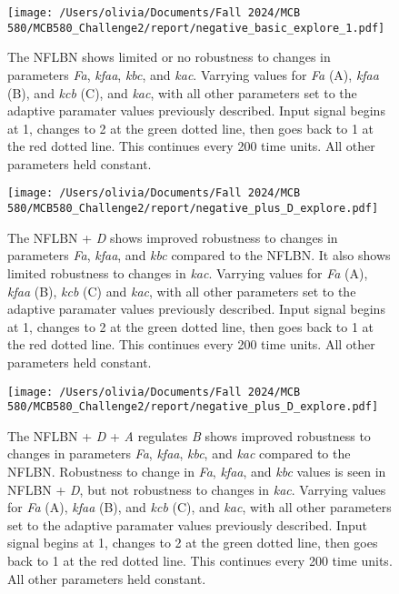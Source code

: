 \documentclass{article}
\begin{document}
\begin{figure}[H]
    \centering
    \texttt{[image: /Users/olivia/Documents/Fall 2024/MCB 580/MCB580\_Challenge2/report/negative\_basic\_explore\_1.pdf]}
    \caption{The NFLBN shows limited or no robustness to changes in parameters \textit{Fa}, \textit{kfaa}, \textit{kbc}, and \textit{kac}. Varrying values for \textit{Fa} (A), \textit{kfaa} (B), and \textit{kcb} (C), and \textit{kac}, with all other parameters set to the adaptive paramater values previously described. Input signal begins at 1, changes to 2 at the green dotted line, then goes back to 1 at the red dotted line. This continues every 200 time units. All other parameters held constant.}
    \label{fig:9}
\end{figure}

\begin{figure}[H]
    \centering
    \texttt{[image: /Users/olivia/Documents/Fall 2024/MCB 580/MCB580\_Challenge2/report/negative\_plus\_D\_explore.pdf]}
    \caption{The NFLBN + \textit{D} shows improved robustness to changes in parameters \textit{Fa}, \textit{kfaa}, and \textit{kbc} compared to the NFLBN. It also shows limited robustness to changes in \textit{kac}. Varrying values for \textit{Fa} (A), \textit{kfaa} (B), \textit{kcb} (C) and \textit{kac}, with all other parameters set to the adaptive paramater values previously described. Input signal begins at 1, changes to 2 at the green dotted line, then goes back to 1 at the red dotted line. This continues every 200 time units. All other parameters held constant.}
    \label{fig:10}
\end{figure}

\begin{figure}[H]
    \centering
    \texttt{[image: /Users/olivia/Documents/Fall 2024/MCB 580/MCB580\_Challenge2/report/negative\_plus\_D\_explore.pdf]}
    \caption{The NFLBN + \textit{D} + \textit{A} regulates \textit{B} shows improved robustness to changes in parameters \textit{Fa}, \textit{kfaa}, \textit{kbc}, and \textit{kac} compared to the NFLBN. Robustness to change in \textit{Fa}, \textit{kfaa}, and \textit{kbc} values is seen in NFLBN + \textit{D}, but not robustness to changes in \textit{kac}. Varrying values for \textit{Fa} (A), \textit{kfaa} (B), and \textit{kcb} (C), and \textit{kac}, with all other parameters set to the adaptive paramater values previously described. Input signal begins at 1, changes to 2 at the green dotted line, then goes back to 1 at the red dotted line. This continues every 200 time units. All other parameters held constant.}
    \label{fig:11}
\end{figure}
\end{document}
